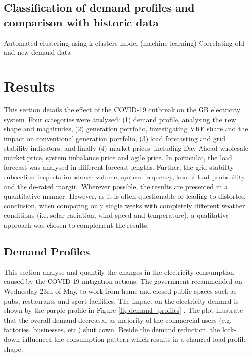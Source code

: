 \documentclass[energies,article,submit,moreauthors,pdftex]{Definitions/mdpi}
\begin{document}
\subsection{Classification of demand profiles and comparison with historic data}
Automated clustering using k-clusters model (machine learning)
Correlating old and new demand data


\section{Results}
This section details the effect of the COVID-19 outbreak on the GB electricity system. Four categories were analysed: (1) demand profile, analysing the new shape and magnitudes, (2) generation portfolio, investigating VRE share and the impact on conventional generation portfolio, (3) load forecasting and grid stability indicators, and finally (4) market prices, including Day-Ahead wholesale market price, system imbalance price and agile price. In particular, the load forecast was analysed in different forecast lengths. Further, the grid stability subsection inspects imbalance volume, system frequency, loss of load probability and the de-rated margin. Wherever possible, the results are presented in a quantitative manner. However, as it is often questionable or leading to distorted conclusion, when comparing only single weeks with completely different weather conditions (i.e. solar radiation, wind speed and temperature), a qualitative approach was chosen to complement the results.


\subsection{Demand Profiles}\label{section: Effect on demand profile}

This section analyse and quantify the changes in the electricity consumption caused by the COVID-19 mitigation actions. The government recommended on Wednesday 23rd of May, to work from home and closed public spaces such as pubs, restaurants and sport facilities. The impact on the electricity demand is shown by the purple profile in Figure \ref{fig:demand_profiles} \cite{GovernmentGOV.UK}. The plot illustrate that the overall demand decreased as majority of the commercial users (e.g. factories, businesses, etc.) shut down.
Beside the demand reduction, the lock-down influenced the consumption pattern which results in a changed load profile shape. 
\end{document}

